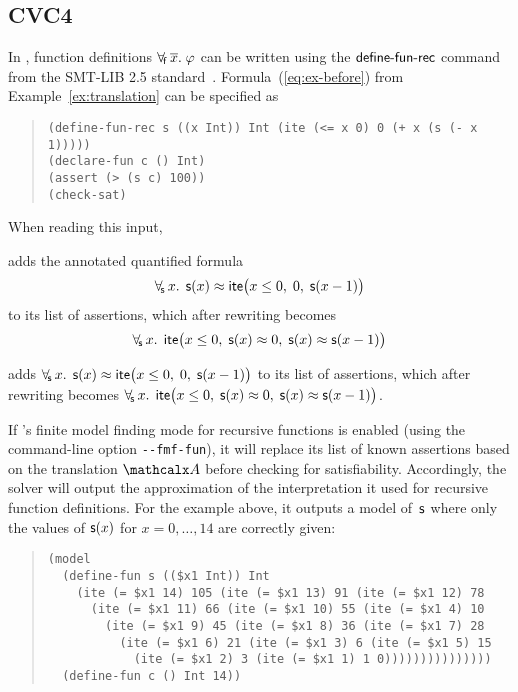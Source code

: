 \subsection{CVC4}
\label{ssec:cvc4}

In \cvc, function definitions $\forall_{\!\mathsf{f}\:} \overline{x}.\; \varphi$ can be written using the $\mathsf{define}\text{-}\mathsf{fun}\text{-}\mathsf{rec}$ command
from the SMT-LIB 2.5 standard~\cite{smtlib25}.
Formula~(\ref{eq:ex-before}) from Example~\ref{ex:translation}
can be specified as %
%
\begin{quote}
\begin{verbatim}
(define-fun-rec s ((x Int)) Int (ite (<= x 0) 0 (+ x (s (- x 1)))))
(declare-fun c () Int)
(assert (> (s c) 100))
(check-sat)
\end{verbatim}
\end{quote}
%
When reading this input,
\begin{rep}%
\cvc adds the annotated quantified formula
$$\forall_{\!\mathsf{s}\:} x.\;\, \mathsf{s}( x ) \approx \mathsf{ite}\bigl( x \leq 0,\; 0,\; \mathsf{s}( x-1 )\bigr)$$
to its list of assertions,
which after rewriting becomes
$$\forall_{\!\mathsf{s}\:} x.\;\, \mathsf{ite}\bigl( x \leq 0,\; \mathsf{s}( x ) \approx 0,\; \mathsf{s}( x ) \approx \mathsf{s}( x-1 ) \bigr)$$
\end{rep}%
\begin{conf}%
\cvc adds
$\forall_{\!\mathsf{s}\:} x.\;\, \mathsf{s}( x ) \approx \mathsf{ite}\bigl( x \leq 0,\; 0,\; \mathsf{s}( x-1 )\bigr)$
to its list of assertions,
which after rewriting becomes
$\forall_{\!\mathsf{s}\:} x.\;\, \mathsf{ite}\bigl( x \leq 0,\; \mathsf{s}( x ) \approx 0,\; \mathsf{s}( x ) \approx \mathsf{s}( x-1 ) \bigr)$. \end{conf}%
If \cvc's finite model finding mode for recursive functions is enabled (using
the command-line option \texttt{-}\texttt{-fmf-fun}), it will replace its list of known
assertions based on the translation $\conv$ before checking for satisfiability.
Accordingly, the solver will output the approximation of the interpretation it
used for recursive function definitions. 
For the example above, it outputs a %
model of~$\mathsf{s}$ where only
the values of $\mathsf{s}(x)$ for $x = 0,\ldots,14$ are correctly given:
\begin{quote}
\begin{verbatim}
(model
  (define-fun s (($x1 Int)) Int 
    (ite (= $x1 14) 105 (ite (= $x1 13) 91 (ite (= $x1 12) 78 
      (ite (= $x1 11) 66 (ite (= $x1 10) 55 (ite (= $x1 4) 10 
        (ite (= $x1 9) 45 (ite (= $x1 8) 36 (ite (= $x1 7) 28 
          (ite (= $x1 6) 21 (ite (= $x1 3) 6 (ite (= $x1 5) 15 
            (ite (= $x1 2) 3 (ite (= $x1 1) 1 0)))))))))))))))
  (define-fun c () Int 14))
\end{verbatim}
\end{quote}

